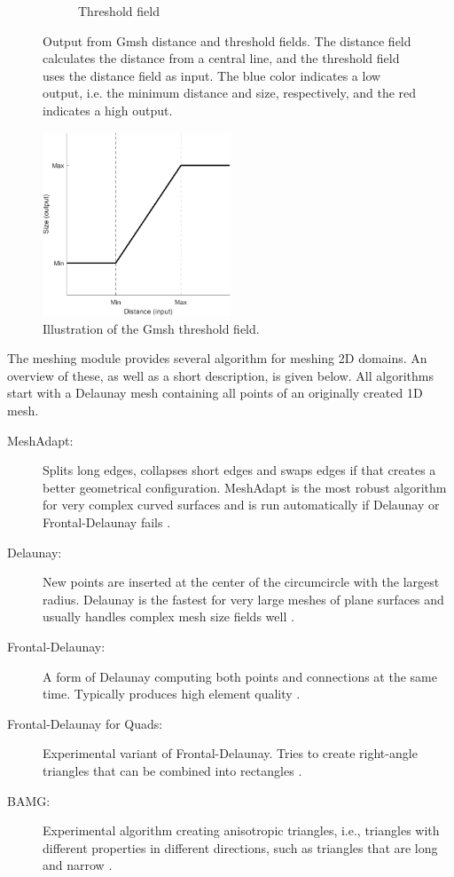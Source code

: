 \begin{figure}[ht]
\begin{subfigure}[b]{0.45\textwidth}
        \caption{Threshold field}
        \label{fig:gmsh-threshold}
    \end{subfigure}
    \caption[Output from Gmsh distance and threshold fields.]{Output from Gmsh distance and threshold fields. The distance field calculates the distance from a central line, and the threshold field uses the distance field as input. The blue color indicates a low output, i.e. the minimum distance and size, respectively, and the red indicates a high output.}
    \label{fig:gmsh-fields}
\end{figure}

\begin{figure}[ht]
    \centering
    \includegraphics[width=0.5\textwidth]{report/Images/Software/thresholdCurve.png}
    \caption{Illustration of the Gmsh threshold field.}
    \label{fig:threshold-field}
\end{figure}


The meshing module provides several algorithm for meshing 2D domains. An overview of these, as well as a short description, is given below. All algorithms start with a Delaunay mesh containing all points of an originally created 1D mesh.
\begin{description}
    \item[MeshAdapt:] Splits long edges, collapses short edges and swaps edges if that creates a better geometrical configuration. MeshAdapt is the most robust algorithm for very complex curved surfaces and is run automatically if Delaunay or Frontal-Delaunay fails \cite{Gmsh_reference}.
    \item[Delaunay:] New points are inserted at the center of the circumcircle with the largest radius. Delaunay is the fastest for very large meshes of plane surfaces and usually handles complex mesh size fields well \cite{Gmsh_reference}.
    \item[Frontal-Delaunay:] A form of Delaunay computing both points and connections at the same time. Typically produces high element quality \cite{Gmsh_reference}.
    \item[Frontal-Delaunay for Quads:] Experimental variant of Frontal-Delaunay. Tries to create right-angle triangles that can be combined into rectangles \cite{Gmsh_reference}.
    \item[BAMG:] Experimental algorithm creating anisotropic triangles, i.e., triangles with different properties in different directions, such as triangles that are long and narrow \cite{Gmsh_reference}.
\end{description}

